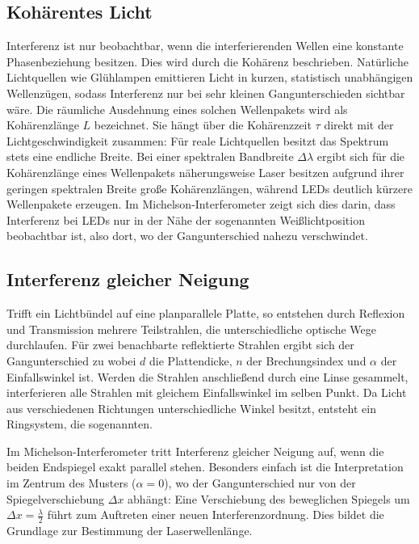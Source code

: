 \subsection[Kohärenz]{Kohärentes Licht}
Interferenz ist nur beobachtbar, wenn die interferierenden Wellen eine konstante Phasenbeziehung besitzen. Dies wird durch die Kohärenz beschrieben. Natürliche Lichtquellen wie Glühlampen emittieren Licht in kurzen, statistisch unabhängigen Wellenzügen, sodass Interferenz nur bei sehr kleinen Gangunterschieden sichtbar wäre.  
Die räumliche Ausdehnung eines solchen Wellenpakets wird als Kohärenzlänge \(L\) bezeichnet. Sie hängt über die Kohärenzzeit \(\tau\) direkt mit der Lichtgeschwindigkeit zusammen:
Für reale Lichtquellen besitzt das Spektrum stets eine endliche Breite. Bei einer spektralen Bandbreite \(\Delta \lambda\) ergibt sich für die Kohärenzlänge eines Wellenpakets näherungsweise
Laser besitzen aufgrund ihrer geringen spektralen Breite große Kohärenzlängen, während LEDs deutlich kürzere Wellenpakete erzeugen.
Im Michelson-Interferometer zeigt sich dies darin, dass Interferenz bei LEDs nur in der Nähe der sogenannten Weißlichtposition beobachtbar ist, also dort, wo der Gangunterschied nahezu verschwindet.


\subsection{Interferenz gleicher Neigung}
Trifft ein Lichtbündel auf eine planparallele Platte, so entstehen durch Reflexion und Transmission mehrere Teilstrahlen, die unterschiedliche optische Wege durchlaufen.
Für zwei benachbarte reflektierte Strahlen ergibt sich der Gangunterschied zu
    wobei \(d\) die Plattendicke, \(n\) der Brechungsindex und \(\alpha\) der Einfallswinkel ist.  
    Werden die Strahlen anschließend durch eine Linse gesammelt, interferieren alle Strahlen mit gleichem Einfallswinkel im selben Punkt. Da Licht aus verschiedenen Richtungen unterschiedliche Winkel besitzt, entsteht ein Ringsystem, die sogenannten.  

Im Michelson-Interferometer tritt Interferenz gleicher Neigung auf, wenn die beiden Endspiegel exakt parallel stehen. Besonders einfach ist die Interpretation im Zentrum des Musters (\(\alpha = 0\)), wo der Gangunterschied nur von der Spiegelverschiebung \(\Delta x\) abhängt:
Eine Verschiebung des beweglichen Spiegels um \(\Delta x = \frac{\lambda}{2}\) führt zum Auftreten einer neuen Interferenzordnung. Dies bildet die Grundlage zur Bestimmung der Laserwellenlänge.

